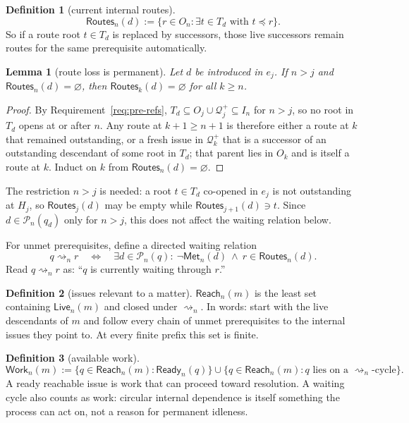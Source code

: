 \documentclass[11pt]{article}
\newtheorem{lemma}{Lemma}
\theoremstyle{definition}
\newtheorem*{definition}{Definition}
\theoremstyle{remark}
\newcommand{\Met}{\mathsf{Met}}
\newcommand{\Pre}{\mathcal P}
\newcommand{\Ready}{\mathsf{Ready}}
\newcommand{\Live}{\mathsf{Live}}
\newcommand{\Routes}{\mathsf{Routes}}
\newcommand{\Reach}{\mathsf{Reach}}
\newcommand{\Work}{\mathsf{Work}}
\newcommand{\Born}{\mathcal Q^{+}}
\begin{document}
\begin{definition}[current internal routes]
\[
 \Routes_n(d):=\{r\in O_n:\exists t\in T_d\text{ with }t\preceq r\}.
\]
So if a route root $t\in T_d$ is replaced by successors, those live successors
remain routes for the same prerequisite automatically.
\end{definition}

\begin{lemma}[route loss is permanent]\label{lem:route-extinction}
Let $d$ be introduced in $e_j$. If $n>j$ and $\Routes_n(d)=\varnothing$, then
$\Routes_k(d)=\varnothing$ for all $k\ge n$.
\end{lemma}

\begin{proof}
By Requirement~\ref{req:pre-refs}, $T_d\subseteq O_j\cup\Born_j\subseteq I_n$
for $n>j$, so no root in $T_d$ opens at or after $n$. Any route at $k+1\ge n+1$
is therefore either a route at $k$ that remained outstanding, or a fresh issue
in $\Born_k$ that is a successor of an outstanding descendant of some root in
$T_d$; that parent lies in $O_k$ and is itself a route at $k$. Induct on $k$
from $\Routes_n(d)=\varnothing$.
\end{proof}

The restriction $n>j$ is needed: a root $t\in T_d$ co-opened in $e_j$ is not
outstanding at $H_j$, so $\Routes_j(d)$ may be empty while
$\Routes_{j+1}(d)\ni t$. Since $d\in\Pre_n(q_d)$ only for $n>j$, this does not
affect the waiting relation below.

For unmet prerequisites, define a directed waiting relation
\[
 q\rightsquigarrow_n r
 \quad\Longleftrightarrow\quad
 \exists d\in\Pre_n(q):\ \neg\Met_n(d)\ \wedge\ r\in\Routes_n(d).
\]
Read $q\rightsquigarrow_n r$ as: ``$q$ is currently waiting through $r$.''

\begin{definition}[issues relevant to a matter]
$\Reach_n(m)$ is the least set containing $\Live_n(m)$ and closed under
$\rightsquigarrow_n$. In words: start with the live descendants of $m$ and
follow every chain of unmet prerequisites to the internal issues they point to.
At every finite prefix this set is finite.
\end{definition}

\begin{definition}[available work]
\[
 \Work_n(m)
 :=\{q\in\Reach_n(m):\Ready_n(q)\}
 \cup
 \{q\in\Reach_n(m):q\text{ lies on a }\rightsquigarrow_n\text{-cycle}\}.
\]
A ready reachable issue is work that can proceed toward resolution. A waiting
cycle also counts as work: circular internal dependence is itself something
the process can act on, not a reason for permanent idleness.
\end{definition}
\end{document}
